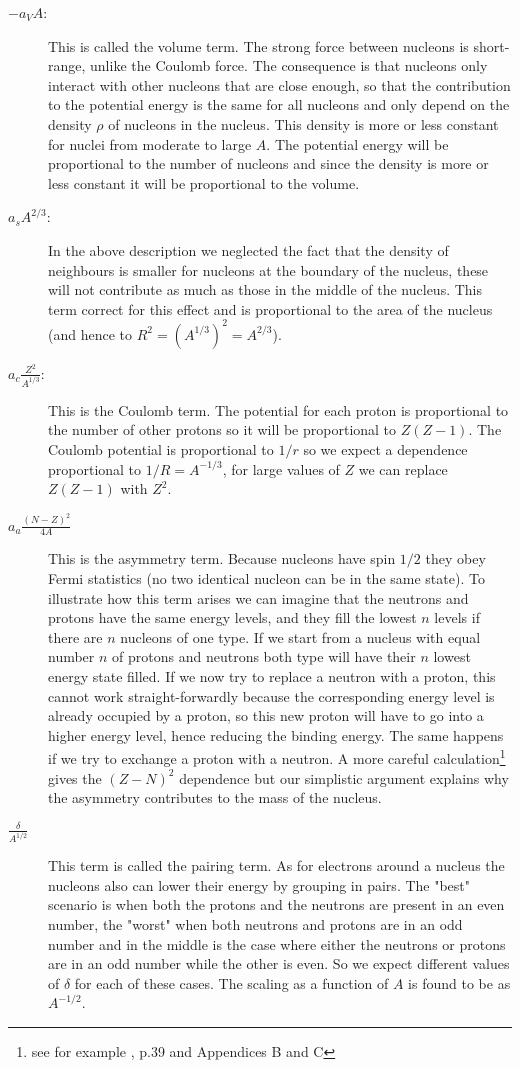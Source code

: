 \documentclass[12pt]{article}
\begin{document}
\begin{description}
\item[$-a_V A$: ] This is called the volume term. The strong force between nucleons is short-range, unlike the Coulomb force. The consequence is that nucleons only interact with other nucleons that are close enough, so that the contribution to the potential energy is the same for all nucleons and only depend on the density $\rho$ of nucleons in the nucleus. This density is more or less constant for nuclei from moderate to large $A$. The potential energy will be proportional to the number of nucleons and since the density is more or less constant it will be proportional to the volume.   
\item[$a_sA^{2/3}$:] In the above description we neglected the fact that the density of neighbours is smaller for nucleons at the boundary of the nucleus, these will not contribute as much as those in the middle of the nucleus. This term correct for this effect and is proportional to the area of the nucleus (and hence to $R^2=(A^{1/3})^2=A^{2/3}$).
\item[$a_c\frac{Z^2}{A^{1/3}}$:] This is the Coulomb term. The potential for each proton is proportional to the number of other protons so it will be proportional to $Z(Z-1)$. The Coulomb potential is proportional to $1/r$ so we expect a dependence proportional to $1/R=A^{-1/3}$, for large values of $Z$ we can replace $Z(Z-1)$ with $Z^2$.
\item[$a_a\frac{(N-Z)^2}{4A}$] This is the asymmetry term. Because nucleons have spin $1/2$ they obey Fermi statistics (no two identical nucleon can be in the same state). To illustrate how this term arises we can imagine that the neutrons and protons have the same energy levels, and they fill the lowest $n$ levels if there are $n$ nucleons of one type. If we start from a nucleus with equal number $n$ of protons and neutrons both type will have their $n$ lowest energy state filled. If we now try to replace a neutron with a proton, this cannot work straight-forwardly because the corresponding energy level is already occupied by a proton, so this new proton will have to go into a higher energy level, hence reducing the binding energy. The same happens if we try to exchange a proton with a neutron. A more careful calculation\footnote{see for example \cite{Lilley:2009zz}, p.39 and Appendices B and C} gives the $(Z-N)^2$ dependence but our simplistic argument explains why the asymmetry contributes to the mass of the nucleus.    
\item[$\frac{\delta}{A^{1/2}}$] This term is called the pairing term. As for electrons around a nucleus the nucleons also can lower their energy by grouping in pairs. The "best" scenario is when both the protons and the neutrons are present in an even number, the "worst" when both neutrons and protons are in an odd number and in the middle is the case where either the neutrons or protons are in an odd number while the other is even. So we expect different values of $\delta$ for each of these cases. The scaling as a function of $A$ is found to be as $A^{-1/2}$.     

\end{description}
\end{document}
